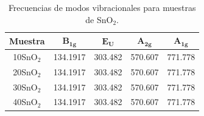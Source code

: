 \documentclass[12pt]{article}
\begin{document}
        \begin{table}[h!]
        \centering
        \caption{Frecuencias de modos vibracionales para muestras de SnO\(_{2}\).}
        \begin{tabular}{|c|c|c|c|c|}
        \hline
        \textbf{Muestra}   & \(\mathbf{B_{1g}}\) & \(\mathbf{E_{U}}\) & \(\mathbf{A_{2g}}\) & \(\mathbf{A_{1g}}\) \\ \hline
        10SnO\(_{2}\)     & 134.1917           & 303.482           & 570.607            & 771.778            \\ \hline
        20SnO\(_{2}\)     & 134.1917           & 303.482           & 570.607            & 771.778            \\ \hline
        30SnO\(_{2}\)     & 134.1917           & 303.482           & 570.607            & 771.778            \\ \hline
        40SnO\(_{2}\)     & 134.1917           & 303.482           & 570.607            & 771.778            \\ \hline
        \end{tabular}
        
        \label{tab:modos_snO2}
        \end{table}
\end{document}
